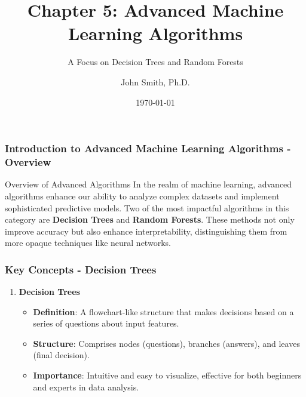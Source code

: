 \documentclass[aspectratio=169]{beamer}
\title[Chapter 5: Advanced ML Algorithms]{Chapter 5: Advanced Machine Learning Algorithms}
\subtitle{A Focus on Decision Trees and Random Forests}
\author[J. Smith]{John Smith, Ph.D.}
\institute[University Name]{
  Department of Computer Science\\
  University Name\\
  \vspace{0.3cm}
  Email: email@university.edu\\
  Website: www.university.edu
}
\date{\today}
\begin{document}
\frame{\titlepage}

\begin{frame}[fragile]
    \titlepage
\end{frame}

\begin{frame}[fragile]
    \frametitle{Introduction to Advanced Machine Learning Algorithms - Overview}
    \begin{block}{Overview of Advanced Algorithms}
        In the realm of machine learning, advanced algorithms enhance our ability to analyze complex datasets and implement sophisticated predictive models. 
        Two of the most impactful algorithms in this category are \textbf{Decision Trees} and \textbf{Random Forests}. 
        These methods not only improve accuracy but also enhance interpretability, distinguishing them from more opaque techniques like neural networks.
    \end{block}
\end{frame}

\begin{frame}[fragile]
    \frametitle{Key Concepts - Decision Trees}
    \begin{enumerate}
        \item \textbf{Decision Trees}
        \begin{itemize}
            \item \textbf{Definition}: A flowchart-like structure that makes decisions based on a series of questions about input features.
            \item \textbf{Structure}: Comprises nodes (questions), branches (answers), and leaves (final decision).
            \item \textbf{Importance}: Intuitive and easy to visualize, effective for both beginners and experts in data analysis.
        \end{itemize}
    \end{enumerate}
\end{frame}
\end{document}
